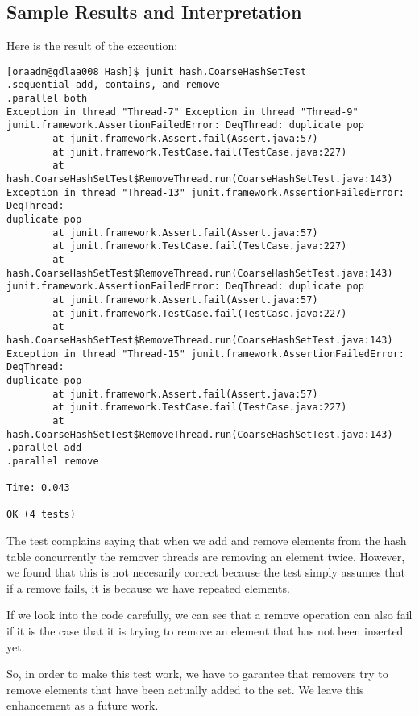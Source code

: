 \subsection{Sample Results and Interpretation}
\par
Here is the result of the execution:
\par
\hfill
\begin{verbatim}
[oraadm@gdlaa008 Hash]$ junit hash.CoarseHashSetTest
.sequential add, contains, and remove
.parallel both
Exception in thread "Thread-7" Exception in thread "Thread-9"
junit.framework.AssertionFailedError: DeqThread: duplicate pop
        at junit.framework.Assert.fail(Assert.java:57)
        at junit.framework.TestCase.fail(TestCase.java:227)
        at hash.CoarseHashSetTest$RemoveThread.run(CoarseHashSetTest.java:143)
Exception in thread "Thread-13" junit.framework.AssertionFailedError: DeqThread:
duplicate pop
        at junit.framework.Assert.fail(Assert.java:57)
        at junit.framework.TestCase.fail(TestCase.java:227)
        at hash.CoarseHashSetTest$RemoveThread.run(CoarseHashSetTest.java:143)
junit.framework.AssertionFailedError: DeqThread: duplicate pop
        at junit.framework.Assert.fail(Assert.java:57)
        at junit.framework.TestCase.fail(TestCase.java:227)
        at hash.CoarseHashSetTest$RemoveThread.run(CoarseHashSetTest.java:143)
Exception in thread "Thread-15" junit.framework.AssertionFailedError: DeqThread:
duplicate pop
        at junit.framework.Assert.fail(Assert.java:57)
        at junit.framework.TestCase.fail(TestCase.java:227)
        at hash.CoarseHashSetTest$RemoveThread.run(CoarseHashSetTest.java:143)
.parallel add
.parallel remove

Time: 0.043

OK (4 tests)
\end{verbatim}
\hfill
\par
The test complains saying that when we add and remove elements from
the hash table concurrently the remover threads are removing an element twice.
However, we found that this is not necesarily correct because the test simply
assumes that if a remove fails, it is because we have repeated elements. 
\par
If we look into the code carefully, we can see that a remove operation can also
fail if it is the case that it is trying to remove an element that has not been
inserted yet. 
\par
So, in order to make this test work, we have to garantee that removers try to
remove elements that have been actually added to the set. We leave this
enhancement as a future work.
\par
